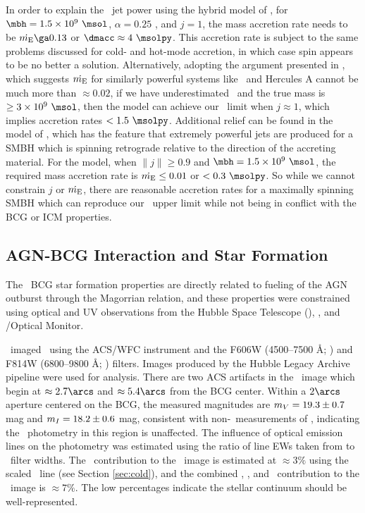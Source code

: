 \documentclass[iop]{emulateapj}
\begin{document}
In order to explain the \rbs\ jet power using the hybrid model of
\citet{2007MNRAS.377.1652N}, for $\mbh = 1.5 \times 10^9 ~\msol$,
$\alpha = 0.25$ \citep{1999ApJ...520..298Q}, and $j = 1$, the mass
accretion rate needs to be $\dme \ga 0.13$ or $\dmacc \approx 4
~\msolpy$. This accretion rate is subject to the same problems
discussed for cold- and hot-mode accretion, in which case spin appears
to be no better a solution. Alternatively, adopting the argument
presented in \citet{minaspin}, which suggests $\dot{m_{\rm{E}}}$ for similarly
powerful systems like \ms\ and Hercules A cannot be much more than
$\approx 0.02$, if we have underestimated \mbh\ and the true mass is
$\ge 3 \times 10^9 ~\msol$, then the \citet{2007MNRAS.377.1652N} model
can achieve our \pjet\ limit when $j \approx 1$, which implies
accretion rates $< 1.5 ~\msolpy$. Additional relief can be found in
the model of \citet{gesspin}, which has the feature that extremely
powerful jets are produced for a SMBH which is spinning retrograde
relative to the direction of the accreting material. For the
\citet{gesspin} model, when $\|j\| \ge 0.9$ and $\mbh = 1.5 \times
10^9 ~\msol$, the required mass accretion rate is $\dot{m_{\rm{E}}} \le 0.01$ or
$< 0.3 ~\msolpy$. So while we cannot constrain $j$ or $\dot{m_{\rm{E}}}$, there
are reasonable accretion rates for a maximally spinning SMBH which can
reproduce our \pjet\ upper limit while not being in conflict with the
BCG or ICM properties.

\subsection{AGN-BCG Interaction and Star Formation}
\label{sec:bcg}

The \rbs\ BCG star formation properties are directly related to
fueling of the AGN outburst through the Magorrian relation, and these
properties were constrained using optical and UV observations from the
Hubble Space Telescope (\hst), \galex, and \xmm/Optical
Monitor.

\hst\ imaged \rbs\ using the ACS/WFC instrument and the F606W
(4500--7500 \AA; \myv) and F814W (6800--9800 \AA; \myi)
filters. Images produced by the Hubble Legacy Archive pipeline were
used for analysis. There are two ACS artifacts in the \myi\ image
which begin at $\approx 2.7\arcs$ and $\approx 5.4\arcs$ from the BCG
center. Within a $2\arcs$ aperture centered on the BCG, the measured
magnitudes are $m_{V} = 19.3 \pm 0.7$ mag and $m_{I} = 18.2 \pm
0.6$ mag, consistent with non-\hst\ measurements of \citet{rbs1},
indicating the \hst\ photometry in this region is unaffected. The
influence of optical emission lines on the photometry was estimated
using the ratio of line EWs taken from \citet{rbs1} to \hst\ filter
widths. The \halpha\ contribution to the \myi\ image is estimated at
$\approx 3\%$ using the scaled \hbeta\ line (see Section
\ref{sec:cold}), and the combined \hbeta, \oii, and
\oiii\ contribution to the \myv\ image is $\approx 7\%$. The low
percentages indicate the stellar continuum should be well-represented.
\end{document}
